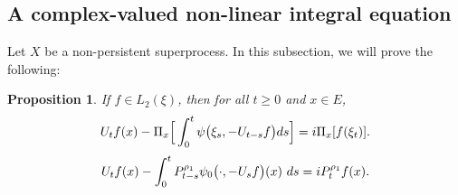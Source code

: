 \documentclass[12pt,a4paper]{amsart}
\theoremstyle{plain}
\newtheorem{prop}[thm]{Proposition}
\theoremstyle{definition}
\numberwithin{equation}{section}
\begin{document}
\subsection{A complex-valued non-linear integral equation}
    Let $X$ be a non-persistent superprocess.
    In this subsection, we will prove the following:
\begin{prop}
\label{prop: complex FKPP-equation}
    If $f\in L_2(\xi)$,  then for all $t\geq 0$ and $x\in E$,
\begin{equation}
\label{eq: complex FKPP-equation}
    U_tf(x) - \Pi_x \Big[\int_0^t \psi\big(\xi_s, - U_{t-s}f\big) ds \Big]
    \\= i \Pi_x [f(\xi_t)].
\end{equation}
\begin{equation}
\label{eq: complex FKPP-equation with FK-transform}
    U_tf(x) -  \int_0^t P_{t-s}^{\rho_1} \psi_0\big(\cdot,-U_sf\big) (x)~ds
    \\= iP_t^{\rho_1} f(x).
\end{equation}
\end{prop}
\end{document}
